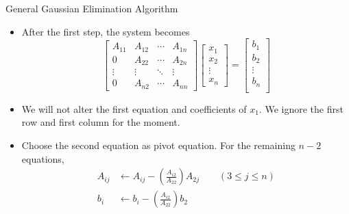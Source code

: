 \documentclass{beamer}
\newcommand{\beforeverb}{\footnotesize}
\newcommand{\afterverb}{\normalsize}
\begin{document}
\begin{frame}{General Gaussian Elimination Algorithm}
\begin{itemize}
\item After the first step, the system becomes 
\beforeverb
\[
\left[ 
\begin{array}{cccc}
A_{11} & A_{12} & \cdots & A_{1n} \\
0 & A_{22} & \cdots & A_{2n} \\
\vdots & \vdots & \ddots & \vdots \\
0 & A_{n2} & \cdots & A_{nn} 
\end{array}
\right]
\left[
\begin{array}{c}
x_1\\
x_2\\
\vdots\\
x_n
\end{array}
\right]
=
\left[
\begin{array}{c}
b_1\\
b_2\\
\vdots\\
b_n\\
\end{array}
\right]
\]
\afterverb
\item We will not alter the first equation and coefficients of $x_1$. We ignore the \alert{first row} and \alert{first column} for the moment.
\item Choose the second equation as pivot equation. For the remaining $n-2$ equations,
\beforeverb
\begin{align*}
A_{ij}&\leftarrow A_{ij}- \left(\frac{A_{i2}}{A_{22}}\right)A_{2j}\quad \quad (3\le j\le n)\\
b_i &\leftarrow  b_i- \left(\frac{A_{i2}}{A_{22}}\right)b_2
\end{align*}
\afterverb
\end{itemize}
\end{frame}
\end{document}
